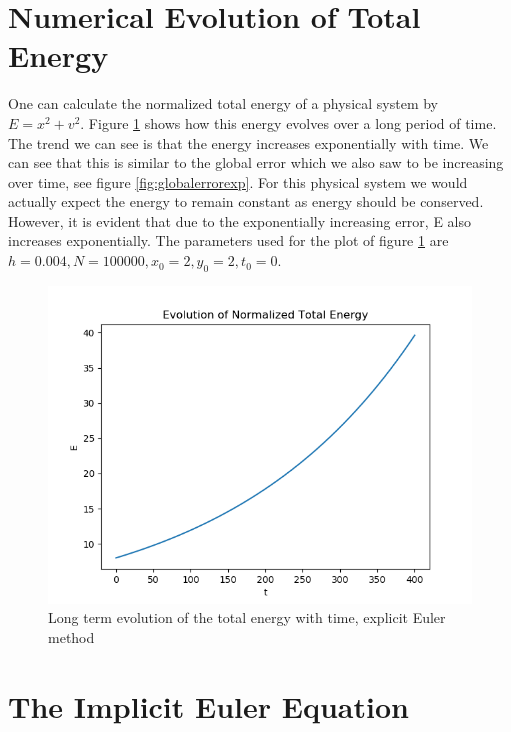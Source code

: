 \documentclass{article}
\begin{document}
\section{Numerical Evolution of Total Energy}
One can calculate the normalized total energy of a physical system by $E=x^2+ v^2$. Figure \ref{fig:totalenergy} shows how this energy evolves over a long period of time. The trend we can see is that the energy increases exponentially with time. We can see that this is similar to the global error which we also saw to be increasing over time, see figure \ref{fig:globalerrorexp}. For this physical system we would actually expect the energy to remain constant as energy should be conserved. However, it is evident that due to the exponentially increasing error, E also increases exponentially. The parameters used for the plot of figure \ref{fig:totalenergy} are $h=0.004, N=100000, x_0=2, y_0=2, t_0=0$.
\begin{figure}[h]
    \centering
    \includegraphics[width = \textwidth]{Images/totalenergy.png}
    \caption{Long term evolution of the total energy with time, explicit Euler method}
    \label{fig:totalenergy}
\end{figure}

\section{The Implicit Euler Equation}
\end{document}
